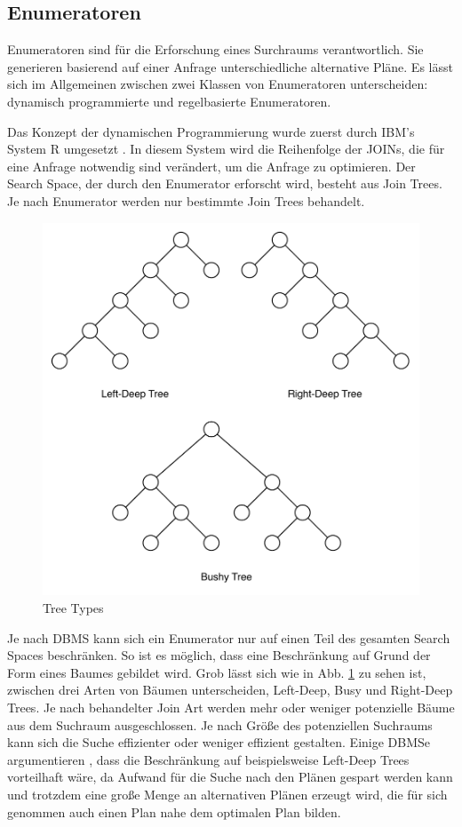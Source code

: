 \subsection{Enumeratoren}



Enumeratoren sind für die Erforschung eines Surchraums verantwortlich. Sie generieren basierend auf einer Anfrage unterschiedliche alternative Pläne. Es lässt sich im Allgemeinen zwischen zwei Klassen von Enumeratoren unterscheiden: dynamisch programmierte und regelbasierte Enumeratoren.  

Das Konzept der dynamischen Programmierung wurde zuerst durch IBM's System R umgesetzt \cite{selinger1979access}. In diesem System wird die Reihenfolge der JOINs, die für eine Anfrage notwendig sind verändert, um die Anfrage zu optimieren. Der Search Space, der durch den Enumerator erforscht wird, besteht aus Join Trees. Je nach Enumerator werden nur bestimmte Join Trees behandelt.


\begin{figure}[h]
  \centering
  \includegraphics[width=\textwidth]{02_Grundlagen/TreeTypes.pdf}
  \caption{Tree Types}
  \label{TreeTypes}
\end{figure}

Je nach \ac{DBMS} kann sich ein Enumerator nur auf einen Teil des gesamten Search Spaces beschränken. So ist es möglich, dass eine Beschränkung auf Grund der Form eines Baumes gebildet wird. Grob lässt sich wie in Abb. \ref{TreeTypes} zu sehen ist, zwischen drei Arten von Bäumen unterscheiden, Left-Deep, Busy und Right-Deep Trees. Je nach behandelter Join Art werden mehr oder weniger potenzielle Bäume aus dem Suchraum ausgeschlossen. Je nach Größe des potenziellen Suchraums kann sich die Suche effizienter oder weniger effizient gestalten. Einige \ac{DBMS}e argumentieren , dass die Beschränkung auf beispielsweise Left-Deep Trees vorteilhaft wäre, da Aufwand für die Suche nach den Plänen gespart werden kann und trotzdem eine große Menge an alternativen Plänen erzeugt wird, die für sich genommen auch einen Plan nahe dem optimalen Plan bilden. 